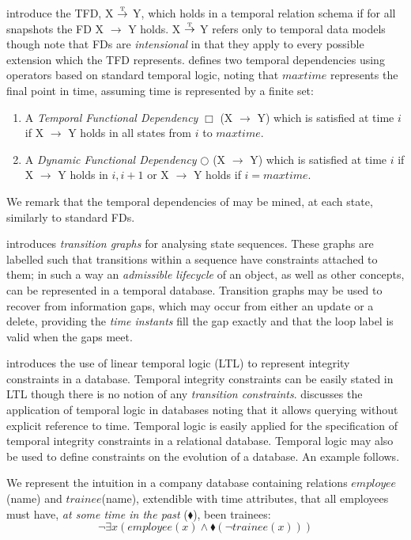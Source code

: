 \smallskip
{}    
\cite{jss96} introduce the TFD, X $\stackrel{\mbox{\tiny{T}}}{\to}$ Y, which
holds in a temporal relation schema if for all snapshots the FD X $\to$ Y
holds. X $\stackrel{\mbox{\tiny{T}}}{\to}$ Y refers only to
temporal data models though \cite{jss96} note that FDs are {\em
intensional} in that they apply to every possible extension which the
TFD represents.
\cite{wij95} defines two temporal dependencies using operators based
 on standard temporal logic, noting that $maxtime$ represents the
 final point in time, assuming time is represented by a finite set:
\begin{enumerate}
\item A {\em Temporal Functional Dependency} $\Box$ (X $\to$ Y) which
 is satisfied at time $i$ if X $\to$ Y holds in all states from $i$ to
 $maxtime$.
\item A {\em Dynamic Functional Dependency} $\bigcirc$ (X $\to$ Y)
which is satisfied at time $i$ if X $\to$ Y holds in $i, i + 1$ or X
$\to$ Y holds if $i = maxtime$. 
\end{enumerate}

We remark that the
temporal dependencies of \cite{Via87,wij95} may be mined, at each
state, similarly to standard FDs.

\cite{gl95} introduces {\em transition graphs} for analysing state
sequences. These graphs are labelled
such that transitions within a sequence have constraints attached to
them; in such a way an {\em admissible lifecycle} of an object, as well
as other concepts, can be represented in a temporal database.
Transition graphs may be used to 
recover from information gaps, which may occur from either an update or
a delete, providing the {\em time instants} fill the gap exactly and that
the loop label is valid when the gaps meet. 


\cite{cho94} introduces the use of linear temporal logic (LTL)
\cite{eme90} to represent 
integrity constraints in a database. Temporal 
integrity constraints can be easily stated in LTL though there is no notion of
any {\em transition constraints}. \cite{ct98} discusses the
application of temporal logic in databases noting that it allows
querying without explicit reference to time. Temporal logic is easily
applied for the specification of temporal integrity constraints in a
relational database.  Temporal logic may also be used to define
constraints on the evolution of a database. An example
follows.
\begin{example}
\begin{rm} 
We represent the intuition in a company database containing relations
\linebreak[4] $employee$(name) and $trainee$(name), extendible with
time attributes, that all employees must have, {\em at some time in the
past} ($\blacklozenge$), been trainees:
\[\neg \exists x ( employee(x) \wedge \blacklozenge (\neg trainee(x)))
\]
\end{rm}
\end{example}


